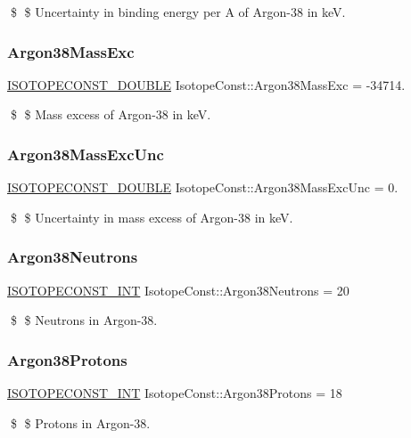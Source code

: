 \$ \$ Uncertainty in binding energy per A of Argon-\/38 in keV. \mbox{\label{group___isotope_const-_argon-_ar38_ga400620d221650b81362aa94c9021f450}} 
\subsubsection{\texorpdfstring{Argon38\+Mass\+Exc}{Argon38MassExc}}
{\footnotesize\ttfamily \mbox{\hyperlink{group___isotope_const-_macros_ga8f45a7272ce02c0b4c65c44636ed719a}{I\+S\+O\+T\+O\+P\+E\+C\+O\+N\+S\+T\+\_\+\+D\+O\+U\+B\+LE}} Isotope\+Const\+::\+Argon38\+Mass\+Exc = -\/34714.}

\$ \$ Mass excess of Argon-\/38 in keV. \mbox{\label{group___isotope_const-_argon-_ar38_ga613176101e3bf8ebfc5115c3da620ac8}} 
\subsubsection{\texorpdfstring{Argon38\+Mass\+Exc\+Unc}{Argon38MassExcUnc}}
{\footnotesize\ttfamily \mbox{\hyperlink{group___isotope_const-_macros_ga8f45a7272ce02c0b4c65c44636ed719a}{I\+S\+O\+T\+O\+P\+E\+C\+O\+N\+S\+T\+\_\+\+D\+O\+U\+B\+LE}} Isotope\+Const\+::\+Argon38\+Mass\+Exc\+Unc = 0.}

\$ \$ Uncertainty in mass excess of Argon-\/38 in keV. \mbox{\label{group___isotope_const-_argon-_ar38_gaef1085453b45d2e58ff5382fae62e289}} 
\subsubsection{\texorpdfstring{Argon38\+Neutrons}{Argon38Neutrons}}
{\footnotesize\ttfamily \mbox{\hyperlink{group___isotope_const-_macros_ga5f18360b3e99483a35c32d789e62621c}{I\+S\+O\+T\+O\+P\+E\+C\+O\+N\+S\+T\+\_\+\+I\+NT}} Isotope\+Const\+::\+Argon38\+Neutrons = 20}

\$ \$ Neutrons in Argon-\/38. \mbox{\label{group___isotope_const-_argon-_ar38_ga535e1cf0f29b27cb49e29aea80081266}} 
\subsubsection{\texorpdfstring{Argon38\+Protons}{Argon38Protons}}
{\footnotesize\ttfamily \mbox{\hyperlink{group___isotope_const-_macros_ga5f18360b3e99483a35c32d789e62621c}{I\+S\+O\+T\+O\+P\+E\+C\+O\+N\+S\+T\+\_\+\+I\+NT}} Isotope\+Const\+::\+Argon38\+Protons = 18}

\$ \$ Protons in Argon-\/38. 